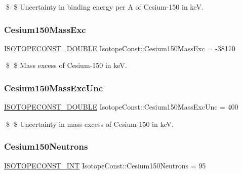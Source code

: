 \$ \$ Uncertainty in binding energy per A of Cesium-\/150 in keV. \mbox{\label{group___isotope_const-_cesium-_cs150_ga55f1c70e56c56de2a9258b5e002001cb}} 
\subsubsection{\texorpdfstring{Cesium150\+Mass\+Exc}{Cesium150MassExc}}
{\footnotesize\ttfamily \mbox{\hyperlink{group___isotope_const-_macros_ga8f45a7272ce02c0b4c65c44636ed719a}{I\+S\+O\+T\+O\+P\+E\+C\+O\+N\+S\+T\+\_\+\+D\+O\+U\+B\+LE}} Isotope\+Const\+::\+Cesium150\+Mass\+Exc = -\/38170}

\$ \$ Mass excess of Cesium-\/150 in keV. \mbox{\label{group___isotope_const-_cesium-_cs150_gac38da1b69f44b338eab97c38ec01a2b9}} 
\subsubsection{\texorpdfstring{Cesium150\+Mass\+Exc\+Unc}{Cesium150MassExcUnc}}
{\footnotesize\ttfamily \mbox{\hyperlink{group___isotope_const-_macros_ga8f45a7272ce02c0b4c65c44636ed719a}{I\+S\+O\+T\+O\+P\+E\+C\+O\+N\+S\+T\+\_\+\+D\+O\+U\+B\+LE}} Isotope\+Const\+::\+Cesium150\+Mass\+Exc\+Unc = 400}

\$ \$ Uncertainty in mass excess of Cesium-\/150 in keV. \mbox{\label{group___isotope_const-_cesium-_cs150_ga69930dd5c9411c6d11db1e716df7b903}} 
\subsubsection{\texorpdfstring{Cesium150\+Neutrons}{Cesium150Neutrons}}
{\footnotesize\ttfamily \mbox{\hyperlink{group___isotope_const-_macros_ga5f18360b3e99483a35c32d789e62621c}{I\+S\+O\+T\+O\+P\+E\+C\+O\+N\+S\+T\+\_\+\+I\+NT}} Isotope\+Const\+::\+Cesium150\+Neutrons = 95}

